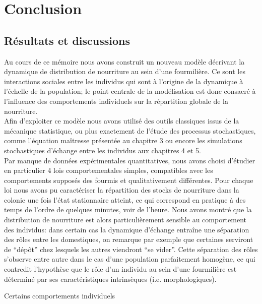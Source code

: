 \chapter{Conclusion}

\section{Résultats et discussions}

Au cours de ce mémoire nous avons construit un nouveau modèle décrivant la dynamique de distribution de nourriture au sein d'une fourmilière. Ce sont les interactions sociales entre les individus qui sont à l'origine de la dynamique à l'échelle de la population; le point centrale de la modélisation est donc consacré à l'influence des comportements individuels sur la répartition globale de la nourriture. \\

Afin d'exploiter ce modèle nous avons utilisé des outils classiques issus de la mécanique statistique, ou plus exactement de l'étude des processus stochastiques, comme l'équation maîtresse présentée au chapitre 3 ou encore les simulations stochastiques d'échange entre les individus aux chapitres 4 et 5. \\

Par manque de données expérimentales quantitatives, nous avons choisi d'étudier en particulier 4 lois comportementales simples, compatibles avec les comportements supposés des fourmis et qualitativement différentes. Pour chaque loi nous avons pu caractériser la répartition des stocks de nourriture dans la colonie une fois l'état stationnaire atteint, ce qui correspond en pratique à des temps de l'ordre de quelques minutes, voir de l'heure. Nous avons montré que la distribution de nourriture est alors particulièrement sensible au comportement des individus: dans certain cas la dynamique d'échange entraîne une séparation des rôles entre les domestiques, on remarque par exemple que certaines serviront de ``dépôt'' chez lesquels les autres viendront ``se vider''. Cette séparation des rôles s'observe entre autre dans le cas d'une population parfaitement homogène, ce qui contredit l'hypothèse que le rôle d'un individu au sein d'une fourmilière est déterminé par ses caractéristiques intrinsèques (i.e. morphologiques).

Certains comportements individuels 

